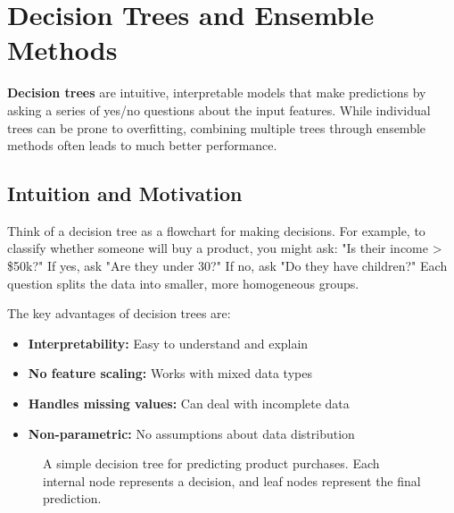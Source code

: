 
\section{Decision Trees and Ensemble Methods }
\label{sec:decision-trees}

\textbf{Decision trees} are intuitive, interpretable models that make predictions by asking a series of yes/no questions about the input features. While individual trees can be prone to overfitting, combining multiple trees through ensemble methods often leads to much better performance.

\subsection{Intuition and Motivation}

Think of a decision tree as a flowchart for making decisions. For example, to classify whether someone will buy a product, you might ask: "Is their income > \$50k?" If yes, ask "Are they under 30?" If no, ask "Do they have children?" Each question splits the data into smaller, more homogeneous groups.

The key advantages of decision trees are:
\begin{itemize}
    \item \textbf{Interpretability:} Easy to understand and explain
    \item \textbf{No feature scaling:} Works with mixed data types
    \item \textbf{Handles missing values:} Can deal with incomplete data
    \item \textbf{Non-parametric:} No assumptions about data distribution
\end{itemize}

\begin{figure}[htbp]
\centering
{}
\caption{A simple decision tree for predicting product purchases. Each internal node represents a decision, and leaf nodes represent the final prediction.}
\label{fig:decision-tree-example}
\end{figure}


